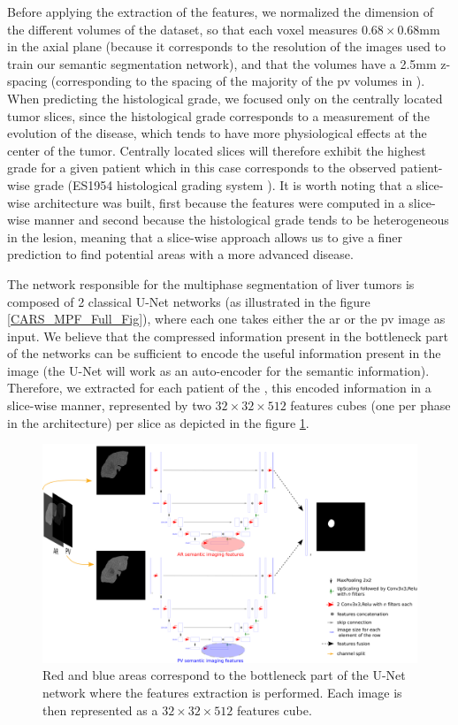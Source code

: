 Before applying the extraction of the features, we normalized
the dimension of the different volumes of the dataset, so that each
voxel measures $ 0.68\times0.68 $mm in the axial plane (because it corresponds to
the resolution of the images used to train our semantic segmentation
network), and that the volumes have a 2.5mm z-spacing (corresponding to the
spacing of the majority of the \ac{pv} volumes in \textbf{}).
When predicting the histological grade, we focused only on the centrally located tumor slices, since the histological grade corresponds to a measurement of the evolution of the
disease, which tends to have more physiological effects at the center of
the tumor. Centrally located slices will therefore exhibit the highest
grade for a given patient which in this case
corresponds to the observed patient-wise grade (ES1954 histological grading system \cite{EdmondsonHA1954}). It is worth noting that a slice-wise architecture was built, first because the features were computed in a slice-wise manner and second because the
histological grade tends to be heterogeneous in the lesion, meaning that
a slice-wise approach allows us to give a finer prediction to find
potential areas with a more advanced disease.

The network responsible for the multiphase segmentation of liver tumors is composed of 2 classical U-Net networks (as illustrated in the figure \ref{CARS_MPF_Full_Fig}), where each
one takes either the \ac{ar} or the \ac{pv} image as input. We believe
that the compressed information present in the bottleneck part of the
networks can be sufficient to encode the useful information present in the
image (the U-Net will work as an auto-encoder for the semantic information). Therefore, we extracted for each patient of the \textbf{}, this
encoded information in a slice-wise manner, represented by two $ 32\times32\times512 $
features cubes (one per phase in the  architecture) per slice
as depicted in the figure \ref{fig:MPF_Features_Selection}.


\begin{figure}[!ht]
	\centering
	\includegraphics[width=0.95\linewidth]{../HistologicalGradePrediction/images/MPF_Features_Selection2}
	\caption{Red and blue areas correspond to the bottleneck part of the U-Net
	network where the features extraction is performed. Each image is then
	represented as a $ 32\times32\times512 $ features cube.}
	\label{fig:MPF_Features_Selection}
\end{figure}




